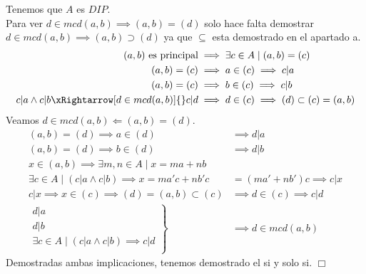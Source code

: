 \begin{solution}
Tenemos que $A$ es $DIP$. \\
Para ver $d \in mcd(a,b) \implies (a,b) = (d)$ solo hace falta demostrar
$d \in mcd(a,b) \implies (a,b) \supset (d)$ ya que $\subseteq$ esta demostrado
en el apartado a.
\begin{align}
(a,b) \text{ es principal} &\implies \exists c \in A \mid (a,b) = (c) \\
(a,b) = (c) &\implies a \in (c) \implies c|a \\
(a,b) = (c) &\implies b \in (c) \implies c|b \\
c|a \land c|b \xRightarrow[d \in mcd(a,b)]{} c|d 
&\implies d \in (c) 
\implies (d) \subset (c)=(a,b)
\end{align}
Veamos $d \in mcd(a,b) \Leftarrow (a,b) = (d)$.
\begin{align}
(a,b) = (d) \implies a \in (d) &\implies d|a \\
(a,b) = (d) \implies b \in (d) &\implies d|b \\
x \in (a,b) \implies \exists m,n \in A \mid x = ma + nb \\
\exists c \in A \mid (c|a \wedge c|b) 
\implies x = ma'c + nb'c &= (ma' + nb')c 
\implies c|x\\
c|x
\implies x \in (c)
\implies (d) = (a,b) \subset (c)
&\implies d \in (c)
\implies c|d\\
\left.\begin{aligned}
       d|a \\
       d|b \\
       \exists c \in A \mid (c|a \wedge c|b) \implies c|d \\
       \end{aligned}
\right\}
&\implies d \in mcd(a,b)
\end{align}
Demostradas ambas implicaciones, tenemos demostrado el si y solo si. $\Box$
\end{solution}